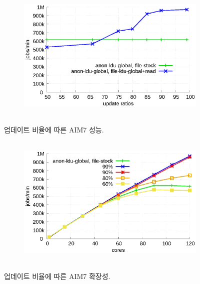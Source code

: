 \begin{figure}[t!]
    \centering
    \begin{subfigure}[b]{1\textwidth}
  \begin{center}
        \includegraphics[height=2.5in]{graph/ratio_aim7.eps}
  \end{center}
    \end{subfigure}%
    \caption{업데이트 비율에 따른 AIM7 성능.}
    \label{fig:UpdateRate_aim7}
\end{figure}

\begin{figure}[t!]
    \centering
    \begin{subfigure}[b]{1\textwidth}
        \includegraphics[height=2.5in]{graph/ratio_aim7_core.eps}
    \end{subfigure}%
    \caption{업데이트 비율에 따른 AIM7 확장성.}
    \label{fig:UpdateRate_aim7_2}
\end{figure}

